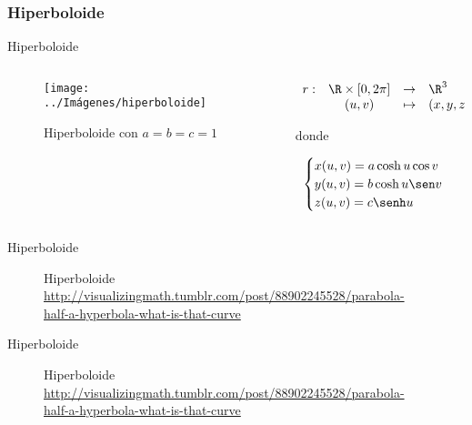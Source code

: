 \documentclass[10pt]{beamer}
\begin{document}
	\subsubsection{Hiperboloide}
	
	\begin{frame}{Hiperboloide}
		\begin{columns}[t] %
			\begin{column}{.50\textwidth}
				\begin{figure}
					\centering
					\texttt{[image: ../Imágenes/hiperboloide]}
					\caption{Hiperboloide con $a=b=c=1$}
					\label{fig:hiperboloide}
				\end{figure}
			\end{column}%
			\hfill%
			\begin{column}{.50\textwidth}
				$$\begin{array}{rcll}
				r : & \R \times [0, 2\pi] & \to & \R^3\\
				& (u,v) & \mapsto & (x,y,z)
				\end{array}$$
				
				donde 
				
				$$ \begin{cases}
				x(u,v) = a \cosh u \cos v \\
				y(u,v) = b \cosh u \sen v \\
				z(u,v) = c \senh u
				\end{cases} $$
			\end{column}%
		\end{columns}
	\end{frame}
	
	\begin{frame}{Hiperboloide}
		\begin{figure}
			\centering
			\caption{Hiperboloide \url{http://visualizingmath.tumblr.com/post/88902245528/parabola-half-a-hyperbola-what-is-that-curve}}
			\label{fig:hiperboloide-1-gif}
		\end{figure}	
	\end{frame}
	
	\begin{frame}{Hiperboloide}
		\begin{figure}
			\centering
			\caption{Hiperboloide \url{http://visualizingmath.tumblr.com/post/88902245528/parabola-half-a-hyperbola-what-is-that-curve}}
			\label{fig:hiperboloide-2-gif}
		\end{figure}	
	\end{frame}
	
\end{document}
